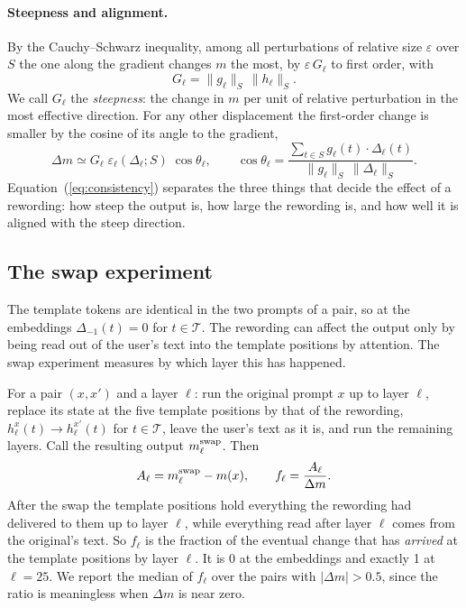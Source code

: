 \documentclass[11pt]{article}
\newcommand{\cT}{\mathcal{T}}
\newcommand{\nrm}[2]{\lVert #1\rVert_{#2}}
\newcommand{\Dm}{\Delta m}
\begin{document}
\paragraph{Steepness and alignment.} By the Cauchy--Schwarz inequality, among all perturbations of relative size $\varepsilon$ over $S$ the one along the gradient changes $m$ the most, by $\varepsilon\,G_\ell$ to first order, with
\begin{equation}
G_\ell=\nrm{g_\ell}{S}\,\nrm{h_\ell}{S} .
\label{eq:G}
\end{equation}
We call $G_\ell$ the \emph{steepness}: the change in $m$ per unit of relative perturbation in the most effective direction. For any other displacement the first-order change is smaller by the cosine of its angle to the gradient,
\begin{equation}
\Dm\simeq G_\ell\;\varepsilon_\ell(\Delta_\ell;S)\;\cos\theta_\ell,\qquad
\cos\theta_\ell=\frac{\sum_{t\in S}g_\ell(t)\cdot\Delta_\ell(t)}{\nrm{g_\ell}{S}\,\nrm{\Delta_\ell}{S}} .
\label{eq:consistency}
\end{equation}
Equation~(\ref{eq:consistency}) separates the three things that decide the effect of a rewording: how steep the output is, how large the rewording is, and how well it is aligned with the steep direction.

\subsection{The swap experiment}
\label{sec:swap}

The template tokens are identical in the two prompts of a pair, so at the embeddings $\Delta_{-1}(t)=0$ for $t\in\cT$. The rewording can affect the output only by being read out of the user's text into the template positions by attention. The swap experiment measures by which layer this has happened.

For a pair $(x,x')$ and a layer $\ell$: run the original prompt $x$ up to layer $\ell$, replace its state at the five template positions by that of the rewording, $h^{x}_\ell(t)\to h^{x'}_\ell(t)$ for $t\in\cT$, leave the user's text as it is, and run the remaining layers. Call the resulting output $m^{\rm swap}_\ell$. Then
\begin{equation}
A_\ell=m^{\rm swap}_\ell-m(x),\qquad f_\ell=\frac{A_\ell}{\Dm} .
\label{eq:arrival}
\end{equation}
After the swap the template positions hold everything the rewording had delivered to them up to layer $\ell$, while everything read after layer $\ell$ comes from the original's text. So $f_\ell$ is the fraction of the eventual change that has \emph{arrived} at the template positions by layer $\ell$. It is 0 at the embeddings and exactly 1 at $\ell=25$. We report the median of $f_\ell$ over the pairs with $|\Dm|>0.5$, since the ratio is meaningless when $\Dm$ is near zero.
\end{document}
